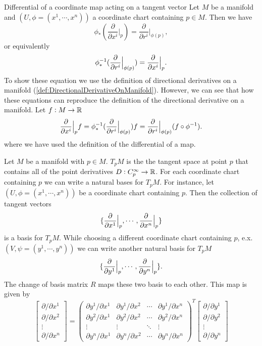 \begin{summary}{Differential of a coordinate map acting on a tangent vector}
	Let $ M $ be a manifold and $ (U,\phi = (x^1,\cdots,x^n)) $ a coordinate chart containing $ p \in M $. Then we have
	\[ \phi_*(\frac{\partial}{\partial  x^i}\big|_{p}) = \frac{\partial}{\partial  r^i}\big|_{\phi(p)} ,\]
	or equivalently
	\[ \phi_*^{-1}(\frac{\partial}{\partial  r^i}\big|_{\phi(p)}) = \frac{\partial}{\partial  x^i}\big|_{p}. \]
	To show these equation we use the definition of directional derivatives on a manifold (\autoref{def:DirectionalDerivativeOnManifold}). However, we can see that how these equations can reproduce the definition of the directional derivative on a manifold. Let $ f:M \to \mathbb{R} $
	\[ \frac{\partial}{\partial  x^i}\big|_{p} f = \phi_*^{-1}(\frac{\partial}{\partial  r^i}\big|_{\phi(p)})f = \frac{\partial}{\partial  r^i}\big|_{\phi(p)}(f\circ\phi^{-1}).  \]
	where we have used the definition of the differential of a map.
\end{summary}

\begin{summary}
	\label{summary:BasesFor TangentSpace}
	Let $ M $ be a manifold with $ p \in M $. $ T_pM $ is the the tangent space at point $ p $ that contains all of the point derivatives $ D: C_p^\infty \to \mathbb{R}$. For each coordinate chart containing $ p $ we can write a natural bases for $ T_pM $. For instance, let $ (U,\phi=(x^1,\cdots,x^n)) $ be a coordinate chart containing $ p $. Then the collection of tangent vectors
	\[ \{ \frac{\partial}{\partial  x^1}\big|_{p}, \cdots, \frac{\partial}{\partial  x^n}\big|_{p} \} \]
	is a basis for $ T_pM $. While choosing a different coordinate chart containing $ p $, e.x. $ (V,\psi=(y^1,\cdots,y^n)) $ we can write another natural basis for $ T_pM $
	\[ \{\frac{\partial}{\partial  y^1}\big|_{p},\cdots,\frac{\partial}{\partial  y^n}\big|_{p}\}. \]
	The change of basis matrix $ R $ maps these two basis to each other. This map is given by
	\[ 
	\begin{bmatrix}
		\partial/\partial x^1 \\
		\partial/\partial x^2 \\
		\vdots \\
		\partial/\partial x^n
	\end{bmatrix} = 
	\begin{pmatrix}
		\partial y^1/\partial x^1 & \partial y^1/\partial x^2 &  \cdots & \partial y^1/\partial x^n \\
		\partial y^2/\partial x^1 & \partial y^2/\partial x^2 &  \cdots & \partial y^2/\partial x^n \\
		\vdots & \vdots & \ddots & \vdots \\
		\partial y^n/\partial x^1 & \partial y^n/\partial x^2 &  \cdots & \partial y^n/\partial x^n
	\end{pmatrix}^T
	\begin{bmatrix}
		\partial/\partial y^1 \\
		\partial/\partial y^2 \\
		\vdots \\
		\partial/\partial y^n
	\end{bmatrix}
	 \]
\end{summary}

